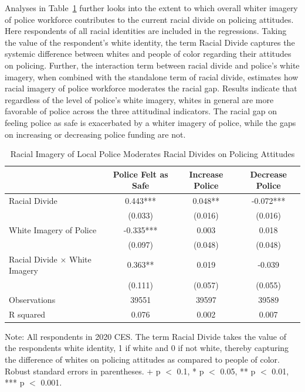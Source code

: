 \documentclass[
  12pt,
]{article}
\begin{document}
Analyses in Table~\ref{tbl-divides} further looks into the extent to
which overall whiter imagery of police workforce contributes to the
current racial divide on policing attitudes. Here respondents of all
racial identities are included in the regressions. Taking the value of
the respondent's white identity, the term Racial Divide captures the
systemic difference between whites and people of color regarding their
attitudes on policing. Further, the interaction term between racial
divide and police's white imagery, when combined with the standalone
term of racial divide, estimates how racial imagery of police workforce
moderates the racial gap. Results indicate that regardless of the level
of police's white imagery, whites in general are more favorable of
police across the three attitudinal indicators. The racial gap on
feeling police as safe is exacerbated by a whiter imagery of police,
while the gaps on increasing or decreasing police funding are not.

\hypertarget{tbl-divides}{}
\begin{table}
\caption{\label{tbl-divides}Racial Imagery of Local Police Moderates Racial Divides on Policing
Attitudes }\tabularnewline

\centering
\begin{threeparttable}
\begin{tabular}[t]{lccc}
\toprule
  & Police Felt as Safe & Increase Police & Decrease Police\\
\midrule
Racial Divide & 0.443*** & 0.048** & -0.072***\\
 & (0.033) & (0.016) & (0.016)\\
White Imagery of Police & -0.335*** & 0.003 & 0.018\\
 & (0.097) & (0.048) & (0.048)\\
Racial Divide × White Imagery & 0.363** & 0.019 & -0.039\\
 & (0.111) & (0.057) & (0.055)\\
\midrule
Observations & 39551 & 39597 & 39589\\
R squared & 0.076 & 0.002 & 0.007\\
\bottomrule
\end{tabular}
\begin{tablenotes}
\item Note: All respondents in 2020 CES. The term Racial Divide takes the value of the respondents white identity, 1 if white and 0 if not white, thereby capturing the difference of whites on policing attitudes as compared to people of color. Robust standard errors in parentheses. + p $<$ 0.1, * p $<$ 0.05, ** p $<$ 0.01, *** p $<$ 0.001.
\end{tablenotes}
\end{threeparttable}
\end{table}
\end{document}
